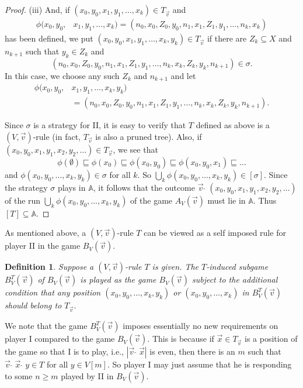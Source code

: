 \documentclass[10pt]{amsart}
\newcommand {\A}{\mathbb A}
\newcommand{\con}{\;\hat{}\;}
\newcommand{\tom} {\emptyset}
\newtheorem{defi} [thm] {Definition}
\theoremstyle{definition}
\begin{document}
\begin{proof}
\noindent (iii) And, if $(x_0,y_0,x_1,y_1,\ldots,x_k)\in T_{\vec v}$ and 
\begin{displaymath}\begin{split}
\phi(x_0,y_0,&x_1,y_1,\ldots,x_k)=(n_0,x_0,Z_0,y_0,n_1,x_1,Z_1,y_1,\ldots,n_k,x_k)
\end{split}\end{displaymath}
has been defined, we put $(x_0,y_0,x_1,y_1,\ldots,x_k,y_k)\in T_{\vec v}$ if there are $Z_k\subseteq X$ and $n_{k+1}$ such that $y_k\in Z_k$ and 
$$
(n_0,x_0,Z_0,y_0,n_1,x_1,Z_1,y_1,\ldots,n_k,x_k,Z_k,y_k,n_{k+1})\in\sigma.
$$
In this case, we choose any such $Z_k$ and $n_{k+1}$ and let 
\begin{displaymath}\begin{split}
\phi(x_0,y_0,&x_1,y_1,\ldots,x_k,y_k)\\
&=(n_0,x_0,Z_0,y_0,n_1,x_1,Z_1,y_1,\ldots,n_k,x_k,Z_k,y_k,n_{k+1}).
\end{split}\end{displaymath}


Since $\sigma$ is a strategy for II, it is easy to verify that $T$ defined as above is a $(V,\vec v)$-rule (in fact, $T_{\vec v}$ is also a pruned tree). Also, if $(x_0,y_0,x_1,y_1,x_2,y_2,\ldots)\in T_{\vec v}$, we see that
$$
\phi(\tom)\sqsubseteq \phi(x_0)\sqsubseteq\phi(x_0,y_0)\sqsubseteq \phi(x_0,y_0,x_1)\sqsubseteq\ldots
$$
and $\phi(x_0,y_0,\ldots,x_k,y_k)\in \sigma$ for all $k$. So $\bigcup_k\phi(x_0,y_0,\ldots,x_k,y_k)\in [\sigma]$. Since the strategy $\sigma$ plays in $\A$, it follows that the outcome $\vec v\con (x_0,y_0,x_1,y_1,x_2,y_2,\ldots)$ of the run  $\bigcup_k\phi(x_0,y_0,\ldots,x_k,y_k)$ of the game $A_V(\vec v)$ must lie in $\A$. Thus $[T]\subseteq \A$.
\end{proof}



As mentioned above, a $(V,\vec v)$-rule $T$ can be viewed as a self imposed rule for player II in the game $B_V(\vec v)$. 


\begin{defi}
Suppose  a $(V,\vec v)$-rule  $T$ is given. The {\em $T$-induced subgame} $B_V^T(\vec v)$ of $B_V(\vec v)$ is played as the game $B_V(\vec v)$ subject to the additional condition that any position $(x_0,y_0,\ldots,x_k,y_k)$ or $(x_0,y_0,\ldots,x_k)$ 
in $B_V^T(\vec v)$ should belong to $T_{\vec v}$.
 \end{defi}
 
 We note that the game $B^T_V(\vec v)$ imposes essentially no new requirements on player I compared to the game $B_V(\vec v)$. This is because if $\vec x\in T_{\vec v}$ is a position of the game so that I is to play, i.e., $|\vec v\con \vec x|$ is even, then there is an $m$ such that $\vec v\con \vec x\con y\in T$ for all $y\in V[m]$. So player I may just assume that he is responding to some $n\geqslant m$ played by II in $B_V(\vec v)$.
 
\end{document}
